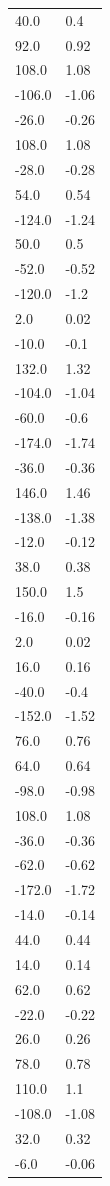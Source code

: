 \begin{longtable}{ll}
40.0 & 0.4 \\
92.0 & 0.92 \\
108.0 & 1.08 \\
-106.0 & -1.06 \\
-26.0 & -0.26 \\
108.0 & 1.08 \\
-28.0 & -0.28 \\
54.0 & 0.54 \\
-124.0 & -1.24 \\
50.0 & 0.5 \\
-52.0 & -0.52 \\
-120.0 & -1.2 \\
2.0 & 0.02 \\
-10.0 & -0.1 \\
132.0 & 1.32 \\
-104.0 & -1.04 \\
-60.0 & -0.6 \\
-174.0 & -1.74 \\
-36.0 & -0.36 \\
146.0 & 1.46 \\
-138.0 & -1.38 \\
-12.0 & -0.12 \\
38.0 & 0.38 \\
150.0 & 1.5 \\
-16.0 & -0.16 \\
2.0 & 0.02 \\
16.0 & 0.16 \\
-40.0 & -0.4 \\
-152.0 & -1.52 \\
76.0 & 0.76 \\
64.0 & 0.64 \\
-98.0 & -0.98 \\
108.0 & 1.08 \\
-36.0 & -0.36 \\
-62.0 & -0.62 \\
-172.0 & -1.72 \\
-14.0 & -0.14 \\
44.0 & 0.44 \\
14.0 & 0.14 \\
62.0 & 0.62 \\
-22.0 & -0.22 \\
26.0 & 0.26 \\
78.0 & 0.78 \\
110.0 & 1.1 \\
-108.0 & -1.08 \\
32.0 & 0.32 \\
-6.0 & -0.06 \\

\end{longtable}
